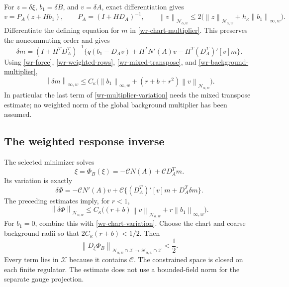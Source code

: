 \documentclass[11pt]{article}
\theoremstyle{remark}
\newcommand{\norm}[1]{\left\|#1\right\|}
\begin{document}
For $z=\delta\xi$, $b_1=\delta B$, and $v=\delta A$, exact
differentiation gives
\begin{equation}\label{wr-chart-variation}
 v=P_A(z+Hb_1),\qquad P_A=(I+HD_A)^{-1},\qquad
 \norm{v}_{\mathcal N_{\alpha,w}}
 \le2\bigl(\norm{z}_{\mathcal N_{\alpha,w}}
                       +h_\kappa\norm{b_1}_{\infty,w}\bigr).
\end{equation}
Differentiate the defining equation for $m$ in
\eqref{wr-chart-multiplier}. This preserves the noncommuting
order and gives
\begin{equation}\label{wr-multiplier-variation}
 \boxed{\quad
 \delta m=(I+H^TD_A^T)^{-1}
 \{q(b_1-D_Av)+H^TN'(A)v-H^T(D_A^T)'[v]m\}.
 \quad}
\end{equation}
Using \eqref{wr-force}, \eqref{wr-weighted-rows},
\eqref{wr-mixed-transpose}, and
\eqref{wr-background-multiplier},
\begin{equation}\label{wr-multiplier-variation-bound}
 \norm{\delta m}_{\infty,w}
 \le C_\kappa\bigl(\norm{b_1}_{\infty,w}
        +(r+b+r^2)\norm{v}_{\mathcal N_{\alpha,w}}\bigr).
\end{equation}
In particular the last term of
\eqref{wr-multiplier-variation} needs the mixed transpose
estimate; no weighted norm of the global background multiplier
has been assumed.

\subsection{The weighted response inverse}
\label{wr-response-inverse}

The selected minimizer solves
\begin{equation}\label{wr-fixed-point}
 \xi=\Phi_B(\xi)=-\mathcal C N(A)+\mathcal C D_A^Tm.
\end{equation}
Its variation is exactly
\begin{equation}\label{wr-phi-variation}
 \delta\Phi=-\mathcal C N'(A)v
       +\mathcal C\{(D_A^T)'[v]m+D_A^T\delta m\}.
\end{equation}
The preceding estimates imply, for $r<1$,
\begin{equation}\label{wr-phi-bound}
 \norm{\delta\Phi}_{\mathcal N_{\alpha,w}}
 \le C_\kappa\bigl((r+b)\norm{v}_{\mathcal N_{\alpha,w}}
                            +r\norm{b_1}_{\infty,w}\bigr).
\end{equation}
For $b_1=0$, combine this with
\eqref{wr-chart-variation}. Choose the chart and coarse
background radii so that $2C_\kappa(r+b)<1/2$. Then
\begin{equation}\label{wr-weighted-contraction}
 \norm{D_\xi\Phi_B}_{\mathcal N_{\alpha,w}\cap\mathcal X
                         \to\mathcal N_{\alpha,w}\cap\mathcal X}
 <\frac12.
\end{equation}
Every term lies in $\mathcal X$ because it contains $\mathcal C$.
The constrained space is closed on each finite regulator. The
estimate does not use a bounded-field norm for the separate gauge
projection.
\end{document}
